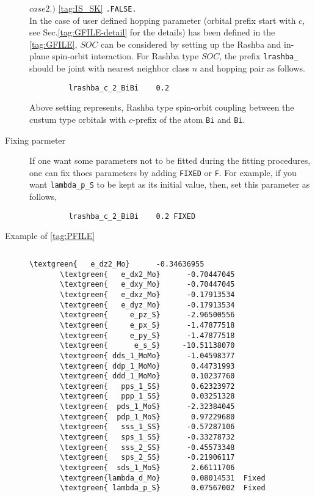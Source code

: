\documentclass[a4paper,12pt]{scrartcl}
\makeatletter
\def\namedlabel#1#2{\begingroup
    #2%
    \def\@currentlabel{#2}%
    \phantomsection\label{#1}\endgroup
}
\newcommand{\textgreen}[1]{\textcolor{green!50!black}{\texttt{#1}}}
\makeatother
\begin{document}
\begin{description}
        \subitem $case 2.)$ \ref{tag:IS_SK} \texttt{.FALSE.} \\
		In the case of user defined hopping parameter (orbital prefix start with $c$,
		see Sec.\ref{tag:GFILE-detail} for the details) has been defined in the 
		\ref{tag:GFILE}, $SOC$ can be considered by setting up the Rashba and in-plane
		spin-orbit interaction.
		For Rashba type $SOC$, the prefix \texttt{lrashba\_} should be joint with 
		nearest neighbor class $n$ and hopping pair as follows.
        \begin{verbatim}
         lrashba_c_2_BiBi    0.2
        \end{verbatim}
		Above setting represents, Rashba type spin-orbit coupling between the
		custum type orbitals with $c$-prefix of the atom \texttt{Bi} and \texttt{Bi}.

	\item[\namedlabel{tag:param-fix}{Fixing parmeter}] $ $\\
		If one want some parameters not to be fitted during the fitting 
		procedures, one can fix thoes parameters by adding \texttt{FIXED} or 
		\texttt{F}.
		For example, if you want \texttt{lambda\_p\_S} to be kept as its initial 
		value, then, set this parameter as follows,
        \begin{verbatim}
         lrashba_c_2_BiBi    0.2 FIXED
        \end{verbatim}

    \item[\namedlabel{tag:param-example}{Example of \ref{tag:PFILE}}] $ $\\

\begin{Verbatim}[commandchars=\\\{\},gobble=4, frame=single, framesep=2mm, 
    label= example of PFILE: PARAM\_FIT.dat for MoS$_2$ (IS\_SK  .TRUE.),
    labelposition=bottomline]
       \textgreen{   e_dz2_Mo}      -0.34636955
       \textgreen{   e_dx2_Mo}      -0.70447045
       \textgreen{   e_dxy_Mo}      -0.70447045
       \textgreen{   e_dxz_Mo}      -0.17913534
       \textgreen{   e_dyz_Mo}      -0.17913534
       \textgreen{     e_pz_S}      -2.96500556
       \textgreen{     e_px_S}      -1.47877518
       \textgreen{     e_py_S}      -1.47877518
       \textgreen{      e_s_S}     -10.51138070
       \textgreen{ dds_1_MoMo}      -1.04598377
       \textgreen{ ddp_1_MoMo}       0.44731993
       \textgreen{ ddd_1_MoMo}       0.10237760
       \textgreen{   pps_1_SS}       0.62323972
       \textgreen{   ppp_1_SS}       0.03251328
       \textgreen{  pds_1_MoS}      -2.32384045
       \textgreen{  pdp_1_MoS}       0.97229680
       \textgreen{   sss_1_SS}      -0.57287106
       \textgreen{   sps_1_SS}      -0.33278732
       \textgreen{   sss_2_SS}      -0.45573348
       \textgreen{   sps_2_SS}      -0.21906117
       \textgreen{  sds_1_MoS}       2.66111706
       \textgreen{lambda_d_Mo}       0.08014531  Fixed
       \textgreen{ lambda_p_S}       0.07567002  Fixed


\end{Verbatim}
\end{description}
\end{document}
